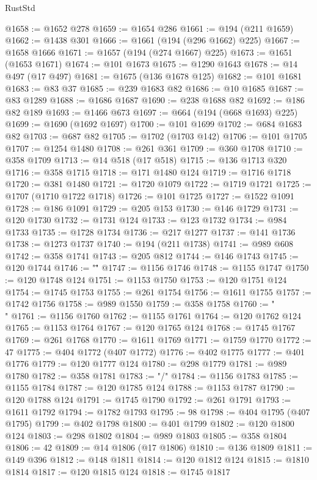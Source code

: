 \begin{lexlean}{RustStd}
\begin{coremodule}
@1658 := @1652 @278
@1659 := @1654 @286
@1661 := @194 (@211 @1659)
@1662 := @1438 @301
@1666 := @1661 (@194 (@296 @1662) @225)
@1667 := @1658 @1666
@1671 := @1657 (@194 (@274 @1667) @225)
@1673 := @1651 (@1653 @1671)
@1674 := @101 @1673
@1675 := @1290 @1643
@1678 := @14 @497 (@17 @497)
@1681 := @1675 (@136 @1678 @125)
@1682 := @101 @1681
@1683 := @83 @37
@1685 := @239 @1683 @82
@1686 := @10 @1685
@1687 := @83 @1289
@1688 := @1686 @1687
@1690 := @238 @1688 @82
@1692 := @186 @82 @189
@1693 := @1466 @673
@1697 := @664 (@194 (@668 @1693) @225)
@1699 := @1690 (@1692 @1697)
@1700 := @101 @1699
@1702 := @684 @1683 @82
@1703 := @687 @82
@1705 := @1702 (@1703 @142)
@1706 := @101 @1705
@1707 := @1254 @1480
@1708 := @261 @361
@1709 := @360 @1708
@1710 := @358 @1709
@1713 := @14 @518 (@17 @518)
@1715 := @136 @1713 @320
@1716 := @358 @1715
@1718 := @171 @1480 @124
@1719 := @1716 @1718
@1720 := @381 @1480
@1721 := @1720 @1079
@1722 := @1719 @1721
@1725 := @1707 (@1710 @1722 @1718)
@1726 := @101 @1725
@1727 := @1522 @1091
@1728 := @186 @1091
@1729 := @205 @153
@1730 := @146 @1729
@1731 := @120 @1730
@1732 := @1731 @124
@1733 := @123 @1732
@1734 := @984 @1733
@1735 := @1728 @1734
@1736 := @217 @1277
@1737 := @141 @1736
@1738 := @1273 @1737
@1740 := @194 (@211 @1738)
@1741 := @989 @608
@1742 := @358 @1741
@1743 := @205 @812
@1744 := @146 @1743
@1745 := @120 @1744
@1746 := "\""
@1747 := @1156 @1746
@1748 := @1155 @1747
@1750 := @120 @1748 @124
@1751 := @1153 @1750
@1753 := @120 @1751 @124
@1754 := @1745 @1753
@1755 := @261 @1754
@1756 := @1611 @1755
@1757 := @1742 @1756
@1758 := @989 @1550
@1759 := @358 @1758
@1760 := "\\"
@1761 := @1156 @1760
@1762 := @1155 @1761
@1764 := @120 @1762 @124
@1765 := @1153 @1764
@1767 := @120 @1765 @124
@1768 := @1745 @1767
@1769 := @261 @1768
@1770 := @1611 @1769
@1771 := @1759 @1770
@1772 := 47
@1775 := @404 @1772 (@407 @1772)
@1776 := @402 @1775
@1777 := @401 @1776
@1779 := @120 @1777 @124
@1780 := @298 @1779
@1781 := @989 @1780
@1782 := @358 @1781
@1783 := "/"
@1784 := @1156 @1783
@1785 := @1155 @1784
@1787 := @120 @1785 @124
@1788 := @1153 @1787
@1790 := @120 @1788 @124
@1791 := @1745 @1790
@1792 := @261 @1791
@1793 := @1611 @1792
@1794 := @1782 @1793
@1795 := 98
@1798 := @404 @1795 (@407 @1795)
@1799 := @402 @1798
@1800 := @401 @1799
@1802 := @120 @1800 @124
@1803 := @298 @1802
@1804 := @989 @1803
@1805 := @358 @1804
@1806 := 42
@1809 := @14 @1806 (@17 @1806)
@1810 := @136 @1809
@1811 := @149 @396
@1812 := @148 @1811
@1814 := @120 @1812 @124
@1815 := @1810 @1814
@1817 := @120 @1815 @124
@1818 := @1745 @1817

\end{coremodule}
\end{lexlean}
